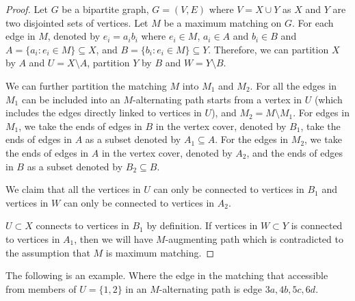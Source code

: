            \begin{proof}
                Let $G$ be a bipartite graph, $G = (V, E)$ where $V = X\cup Y$ as $X$ and $Y$ are two disjointed sets of vertices. Let $M$ be a maximum matching on $G$. For each edge in $M$, denoted by $e_i = a_ib_i$ where $e_i \in M$, $a_i \in A$ and $b_i \in B$ and $A = \{a_i: e_i \in M\} \subseteq X$, and $B = \{b_i: e_i \in M\} \subseteq Y$. Therefore, we can partition $X$ by $A$ and $U = X\setminus A$, partition $Y$ by $B$ and $W = Y\setminus B$.

                We can further partition the matching $M$ into $M_1$ and $M_2$. For all the edges in $M_1$ can be included into an $M$-alternating path starts from a vertex in $U$ (which includes the edges directly linked to vertices in $U$), and $M_2 = M \setminus M_1$. For edges in $M_1$, we take the ends of edges in $B$ in the vertex cover, denoted by $B_1$, take the ends of edges in $A$ as a subset denoted by $A_1 \subseteq A$. For the edges in $M_2$, we take the ends of edges in $A$ in the vertex cover, denoted by $A_2$, and the ends of edges in $B$ as a subset denoted by $B_2 \subseteq B$. 

                We claim that all the vertices in $U$ can only be connected to vertices in $B_1$ and vertices in $W$ can only be connected to vertices in $A_2$.

                $U \subset X$ connects to vertices in $B_1$ by definition. If vertices in $W \subset Y$ is connected to vertices in $A_1$, then we will have $M$-augmenting path which is contradicted to the assumption that $M$ is maximum matching.
            \end{proof}

            The following is an example. Where the edge in the matching that accessible from members of $U = \{1, 2\}$ in an $M$-alternating path is edge $3a, 4b, 5c, 6d$.

